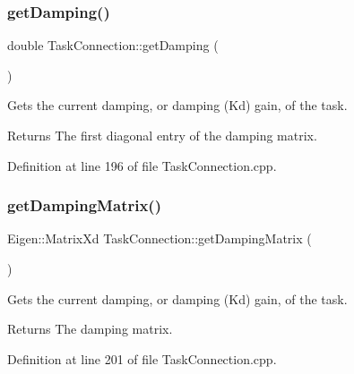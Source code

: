 \subsubsection{\texorpdfstring{get\+Damping()}{getDamping()}}
{\footnotesize\ttfamily double Task\+Connection\+::get\+Damping (\begin{DoxyParamCaption}{ }\end{DoxyParamCaption})}

Gets the current damping, or damping (Kd) gain, of the task.

\begin{DoxyReturn}{Returns}
The first diagonal entry of the damping matrix. 
\end{DoxyReturn}


Definition at line 196 of file Task\+Connection.\+cpp.

\hypertarget{classocra__recipes_1_1TaskConnection_a4176118231f2c5e17e4f749999c9456e}{}\label{classocra__recipes_1_1TaskConnection_a4176118231f2c5e17e4f749999c9456e} 
\subsubsection{\texorpdfstring{get\+Damping\+Matrix()}{getDampingMatrix()}}
{\footnotesize\ttfamily Eigen\+::\+Matrix\+Xd Task\+Connection\+::get\+Damping\+Matrix (\begin{DoxyParamCaption}{ }\end{DoxyParamCaption})}

Gets the current damping, or damping (Kd) gain, of the task.

\begin{DoxyReturn}{Returns}
The damping matrix. 
\end{DoxyReturn}


Definition at line 201 of file Task\+Connection.\+cpp.

\hypertarget{classocra__recipes_1_1TaskConnection_a655f96a4c535179184edf67a961776e7}{}\label{classocra__recipes_1_1TaskConnection_a655f96a4c535179184edf67a961776e7} 
